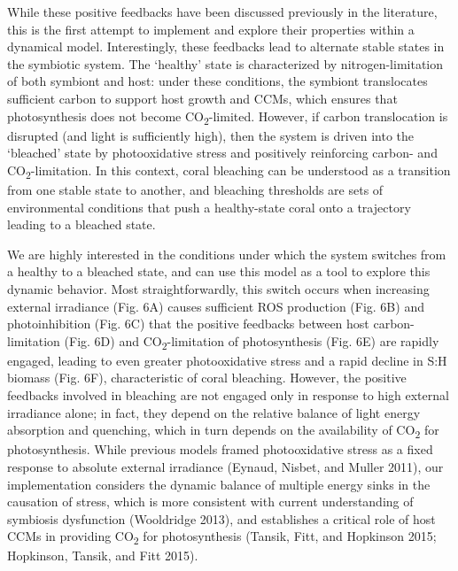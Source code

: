 \documentclass[]{elsarticle} %
\begin{document}
While these positive feedbacks have been discussed previously in the
literature, this is the first attempt to implement and explore their
properties within a dynamical model. Interestingly, these feedbacks lead
to alternate stable states in the symbiotic system. The `healthy' state
is characterized by nitrogen-limitation of both symbiont and host: under
these conditions, the symbiont translocates sufficient carbon to support
host growth and CCMs, which ensures that photosynthesis does not become
CO\textsubscript{2}-limited. However, if carbon translocation is
disrupted (and light is sufficiently high), then the system is driven
into the `bleached' state by photooxidative stress and positively
reinforcing carbon- and CO\textsubscript{2}-limitation. In this context,
coral bleaching can be understood as a transition from one stable state
to another, and bleaching thresholds are sets of environmental
conditions that push a healthy-state coral onto a trajectory leading to
a bleached state.

We are highly interested in the conditions under which the system
switches from a healthy to a bleached state, and can use this model as a
tool to explore this dynamic behavior. Most straightforwardly, this
switch occurs when increasing external irradiance (Fig. 6A) causes
sufficient ROS production (Fig. 6B) and photoinhibition (Fig. 6C) that
the positive feedbacks between host carbon-limitation (Fig. 6D) and
CO\textsubscript{2}-limitation of photosynthesis (Fig. 6E) are rapidly
engaged, leading to even greater photooxidative stress and a rapid
decline in S:H biomass (Fig. 6F), characteristic of coral bleaching.
However, the positive feedbacks involved in bleaching are not engaged
only in response to high external irradiance alone; in fact, they depend
on the relative balance of light energy absorption and quenching, which
in turn depends on the availability of CO\textsubscript{2} for
photosynthesis. While previous models framed photooxidative stress as a
fixed response to absolute external irradiance (Eynaud, Nisbet, and
Muller 2011), our implementation considers the dynamic balance of
multiple energy sinks in the causation of stress, which is more
consistent with current understanding of symbiosis dysfunction
(Wooldridge 2013), and establishes a critical role of host CCMs in
providing CO\textsubscript{2} for photosynthesis (Tansik, Fitt, and
Hopkinson 2015; Hopkinson, Tansik, and Fitt 2015).
\end{document}
